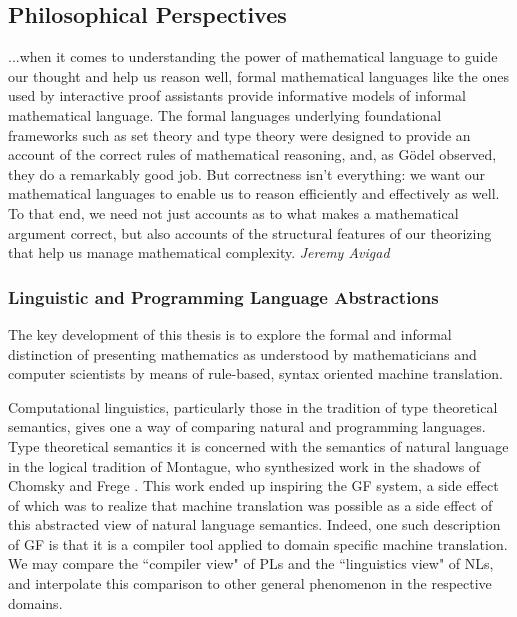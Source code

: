 \subsection{Philosophical Perspectives}

\begin{displayquote}

...when it comes to understanding the power of mathematical language to guide our
thought and help us reason well, formal mathematical languages like the ones
used by interactive proof assistants provide informative models of informal
mathematical language. The formal languages underlying foundational frameworks
such as set theory and type theory were designed to provide an account of the
correct rules of mathematical reasoning, and, as Gödel observed, they do a
remarkably good job. But correctness isn’t everything: we want our mathematical
languages to enable us to reason efficiently and effectively as well. To that
end, we need not just accounts as to what makes a mathematical argument correct,
but also accounts of the structural features of our theorizing that help us
manage mathematical complexity. \emph{Jeremy Avigad} \cite{avigad2015mathematics}

\end{displayquote}

\subsubsection{Linguistic and Programming Language Abstractions}

The key development of this thesis is to explore the formal and informal
distinction of presenting mathematics as understood by mathematicians and computer
scientists by means of rule-based, syntax oriented machine translation.

Computational linguistics, particularly those in the tradition of type
theoretical semantics\cite{ranta1994type}, gives one a way of comparing natural
and programming languages. Type theoretical semantics it is concerned with the
semantics of natural language in the logical tradition of Montague, who
synthesized work in the shadows of Chomsky \cite{Chomsky57} and Frege
\cite{frege79}. This work ended up inspiring the GF system, a side effect of
which was to realize that machine translation was possible as a side effect of
this abstracted view of natural language semantics. Indeed, one such description
of GF is that it is a compiler tool applied to domain specific machine
translation. We may compare the ``compiler view" of PLs and the ``linguistics view"
of NLs, and interpolate this comparison to other general phenomenon in the
respective domains.


